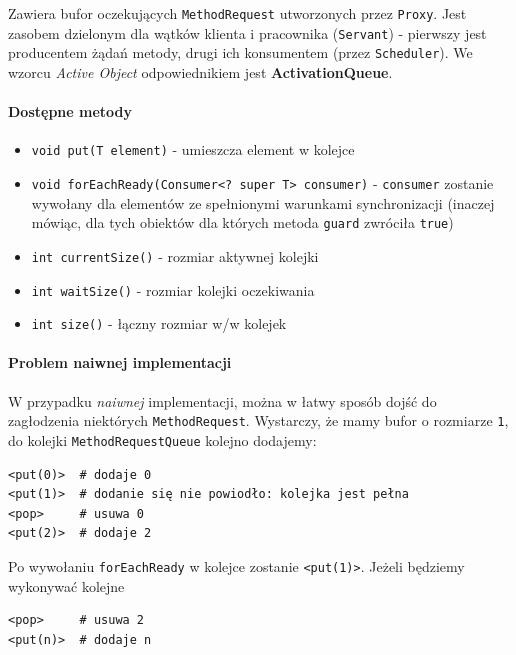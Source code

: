 \documentclass[11pt]{article}
\providecommand{\tightlist}{%
      \setlength{\itemsep}{0pt}\setlength{\parskip}{0pt}}
\begin{document}
Zawiera bufor oczekujących \texttt{MethodRequest} utworzonych przez
\texttt{Proxy}. Jest zasobem dzielonym dla wątków klienta i pracownika
(\texttt{Servant}) - pierwszy jest producentem żądań metody, drugi ich
konsumentem (przez \texttt{Scheduler}). We wzorcu \emph{Active Object}
odpowiednikiem jest \textbf{ActivationQueue}.

\hypertarget{dostux119pne-metody}{%
\paragraph{Dostępne metody}\label{dostux119pne-metody}}

\begin{itemize}
\tightlist
\item
  \texttt{void\ put(T\ element)} - umieszcza element w kolejce
\item
  \texttt{void\ forEachReady(Consumer\textless{}?\ super\ T\textgreater{}\ consumer)}
  - \texttt{consumer} zostanie wywołany dla elementów ze spełnionymi
  warunkami synchronizacji (inaczej mówiąc, dla tych obiektów dla
  których metoda \texttt{guard} zwróciła \texttt{true})
\item
  \texttt{int\ currentSize()} - rozmiar aktywnej kolejki
\item
  \texttt{int\ waitSize()} - rozmiar kolejki oczekiwania
\item
  \texttt{int\ size()} - łączny rozmiar w/w kolejek
\end{itemize}

\hypertarget{problem-naiwnej-implementacji}{%
\paragraph{Problem naiwnej
implementacji}\label{problem-naiwnej-implementacji}}

W przypadku \emph{naiwnej} implementacji, można w łatwy sposób dojść do
zagłodzenia niektórych \texttt{MethodRequest}. Wystarczy, że mamy bufor
o rozmiarze \texttt{1}, do kolejki \texttt{MethodRequestQueue} kolejno
dodajemy:

\begin{verbatim}
<put(0)>  # dodaje 0
<put(1)>  # dodanie się nie powiodło: kolejka jest pełna
<pop>     # usuwa 0
<put(2)>  # dodaje 2
\end{verbatim}

Po wywołaniu \texttt{forEachReady} w kolejce zostanie
\texttt{\textless{}put(1)\textgreater{}}. Jeżeli będziemy wykonywać
kolejne

\begin{verbatim}
<pop>     # usuwa 2
<put(n)>  # dodaje n
\end{verbatim}
\end{document}
